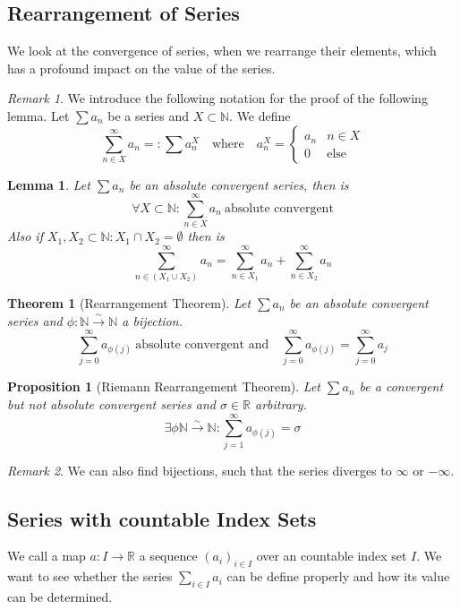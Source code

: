 \documentclass[english,titlepage]{uzhpub}
\theoremstyle{definition}
\theoremstyle{plain}
\newtheorem{proposition}[definition]{Proposition}
\newtheorem{lemma}[definition]{Lemma}
\newtheorem{theorem}[definition]{Theorem} %
\theoremstyle{remark}
\newtheorem*{remark}{Remark}
\theoremstyle{example}
\begin{document}
   \subsection{Rearrangement of Series}
   We look at the convergence of series, when we rearrange their elements, which has a profound impact on the value of the series.

   \begin{remark}
      We introduce the following notation for the proof of the following lemma.
      Let \(\sum a_n\) be a series and \(X \subset \mathbb{N}\).
      We define
      \[\sum_{n \in X}^\infty a_n =: \sum a_n^X \quad\text{where}\quad a_n^X = \begin{cases}a_n & n \in X\\ 0 & \text{else}\end{cases}\]
   \end{remark}
   \begin{lemma}\label{lem:set_series}
      Let \(\sum a_n\) be an absolute convergent series, then is
      \[\forall X \subset \mathbb{N}: \sum_{n\in X}^\infty a_n~\text{absolute convergent}\]
      Also if \(X_1, X_2 \subset \mathbb{N}: X_1 \cap X_2 = \emptyset\) then is
      \[\sum_{n \in (X_1 \cup X_2)}^\infty a_n = \sum_{n \in X_1}^\infty a_n + \sum_{n \in X_2}^\infty a_n\]
   \end{lemma}

   \begin{theorem}[Rearrangement Theorem]\label{thm:rearrange_series}
      Let \(\sum a_n\) be an absolute convergent series and \(\phi: \mathbb{N} \xrightarrow{\sim} \mathbb{N}\) a bijection.
      \[\sum_{j=0}^\infty a_{\phi(j)}~\text{absolute convergent and} \quad \sum_{j=0}^\infty a_{\phi(j)} = \sum_{j=0}^\infty a_j\]
   \end{theorem}

   \begin{proposition}[Riemann Rearrangement Theorem]\label{pro:riemann_rearrang}
      Let \(\sum a_n\) be a convergent but not absolute convergent series and \(\sigma \in \mathbb{R}\) arbitrary.
      \[\exists \phi \mathbb{N} \xrightarrow{\sim} \mathbb{N}: \sum_{j=1}^\infty a_{\phi(j)} = \sigma\]
   \end{proposition}
   \begin{remark}
      We can also find bijections, such that the series diverges to \(\infty\) or \(-\infty\).
   \end{remark}

   \subsection{Series with countable Index Sets}
   We call a map \(a: I \to \mathbb{R}\) a sequence \((a_i)_{i \in I}\) over an countable index set \(I\).
   We want to see whether the series \(\sum_{i\in I} a_i\) can be define properly and how its value can be determined.
\end{document}
